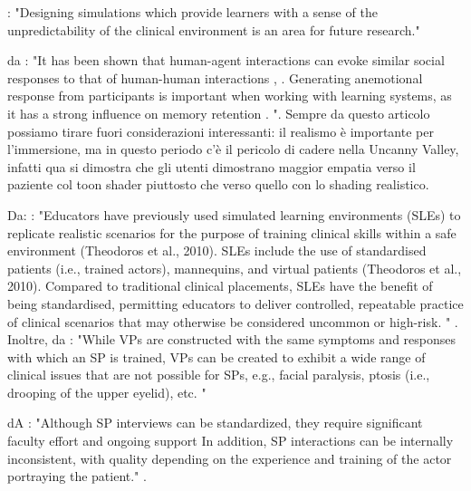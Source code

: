  \cite{peddle2016virtual}: "Designing simulations which provide learners with a sense of the unpredictability of the clinical environment is an area for future research."\par
da \cite{volante2016effects}: "It has been shown that human-agent interactions can evoke similar social responses to that of human-human interactions \cite{pan2011computer}, \cite{robb2013leveraging}. Generating anemotional response from participants is important when working with learning systems, as it has a strong inﬂuence on memory retention \cite{dunsworth2007fostering}. ". Sempre da questo articolo \cite{volante2016effects} possiamo tirare fuori considerazioni interessanti: il realismo è importante per l'immersione, ma in questo periodo c'è il pericolo di cadere nella Uncanny Valley, infatti qua si dimostra che gli utenti dimostrano maggior empatia verso il paziente col toon shader piuttosto che verso quello con lo shading realistico. 

 Da: \cite{banszki2018clinical}: "Educators have previously used simulated learning environments (SLEs) to replicate realistic scenarios for the purpose of training clinical skills within a safe environment (Theodoros et al., 2010). SLEs include the use of standardised patients (i.e., trained actors), mannequins, and virtual patients (Theodoros et al., 2010). Compared to traditional clinical placements, SLEs have the benefit of being standardised, permitting educators to deliver controlled, repeatable practice of clinical scenarios that may otherwise be considered uncommon or high-risk. " . Inoltre, da \cite{kleinsmith2015understanding}: "While VPs are constructed with the same symptoms and responses with which an SP is trained, VPs can be created to exhibit a wide range of clinical issues that are not possible for SPs, e.g., facial paralysis, ptosis (i.e., drooping of the upper eyelid), etc. "\par

dA \cite{maicher2017developing}: "Although SP interviews can be standardized, they require significant faculty effort and ongoing support In addition, SP interactions can be internally inconsistent, with quality depending on the experience and training of the actor portraying the patient." .\par

